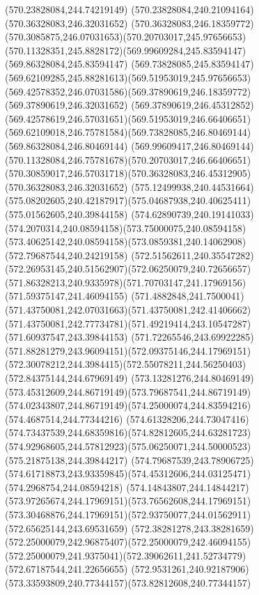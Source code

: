 {{	\lineto(570.23828084,244.74219149)
	\lineto(570.23828084,240.21094164)
	\closepath
	\moveto(570.36328083,246.32031652)
	\curveto(570.36328083,246.18359772)(570.3085875,246.07031653)(570.20703017,245.97656653)
	\curveto(570.11328351,245.8828172)(569.99609284,245.83594147)(569.86328084,245.83594147)
	\curveto(569.73828085,245.83594147)(569.62109285,245.88281613)(569.51953019,245.97656653)
	\curveto(569.42578352,246.07031586)(569.37890619,246.18359772)(569.37890619,246.32031652)
	\curveto(569.37890619,246.45312852)(569.42578619,246.57031651)(569.51953019,246.66406651)
	\curveto(569.62109018,246.75781584)(569.73828085,246.80469144)(569.86328084,246.80469144)
	\curveto(569.99609417,246.80469144)(570.11328084,246.75781678)(570.20703017,246.66406651)
	\curveto(570.30859017,246.57031718)(570.36328083,246.45312905)(570.36328083,246.32031652)
	\closepath
	\moveto(575.12499938,240.44531664)
	\curveto(575.08202605,240.42187917)(575.04687938,240.40625411)(575.01562605,240.39844158)
	\curveto(574.62890739,240.19141033)(574.2070314,240.08594158)(573.75000075,240.08594158)
	\curveto(573.40625142,240.08594158)(573.0859381,240.14062908)(572.79687544,240.24219158)
	\curveto(572.51562611,240.35547282)(572.26953145,240.51562907)(572.06250079,240.72656657)
	\curveto(571.86328213,240.9335978)(571.70703147,241.17969156)(571.59375147,241.46094155)
	\curveto(571.4882848,241.7500041)(571.43750081,242.07031663)(571.43750081,242.41406662)
	\curveto(571.43750081,242.77734781)(571.49219414,243.10547287)(571.60937547,243.39844153)
	\curveto(571.72265546,243.69922285)(571.88281279,243.96094151)(572.09375146,244.17969151)
	\curveto(572.30078212,244.3984415)(572.55078211,244.56250403)(572.84375144,244.67969149)
	\curveto(573.13281276,244.80469149)(573.45312609,244.86719149)(573.79687541,244.86719149)
	\curveto(574.02343807,244.86719149)(574.25000074,244.83594216)(574.4687514,244.77344216)
	\curveto(574.61328206,244.73047416)(574.73437539,244.68359816)(574.82812605,244.63281723)
	\curveto(574.92968605,244.57812923)(575.06250071,244.50000523)(575.21875138,244.39844217)
	\lineto(574.79687539,243.78906725)
	\curveto(574.61718873,243.93359845)(574.45312606,244.03125471)(574.2968754,244.08594218)
	\curveto(574.14843807,244.14844217)(573.97265674,244.17969151)(573.76562608,244.17969151)
	\curveto(573.30468876,244.17969151)(572.93750077,244.01562911)(572.65625144,243.69531659)
	\curveto(572.38281278,243.38281659)(572.25000079,242.96875407)(572.25000079,242.46094155)
	\curveto(572.25000079,241.9375041)(572.39062611,241.52734779)(572.67187544,241.22656655)
	\curveto(572.9531261,240.92187906)(573.33593809,240.77344157)(573.82812608,240.77344157)
}}
